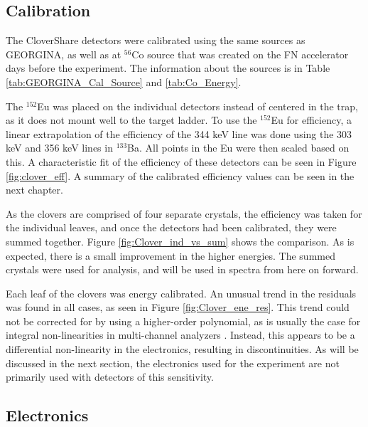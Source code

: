 \subsection{Calibration}

The CloverShare detectors were calibrated using the same sources as GEORGINA, as well as at $^{56}$Co source that was created on the FN accelerator days before the experiment. The information about the sources is in Table \ref{tab:GEORGINA_Cal_Source} and \ref{tab:Co_Energy}. 



The $^{152}$Eu was placed on the individual detectors instead of centered in the trap, as it does not mount well to the target ladder. To use the $^{152}$Eu for efficiency, a linear extrapolation of the efficiency of the 344 keV line was done using the 303 keV and 356 keV lines in $^{133}$Ba. All points in the Eu were then scaled based on this. A characteristic fit of the efficiency of these detectors can be seen in Figure \ref{fig:clover_eff}. A summary of the calibrated efficiency values can be seen in the next chapter.



As the clovers are comprised of four separate crystals, the efficiency was taken for the individual leaves, and once the detectors had been calibrated, they were summed together. Figure \ref{fig:Clover_ind_vs_sum} shows the comparison. As is expected, there is a small improvement in the higher energies. The summed crystals were used for analysis, and will be used in spectra from here on forward.



Each leaf of the clovers was energy calibrated. An unusual trend in the residuals was found in all cases, as seen in Figure \ref{fig:Clover_ene_res}. This trend could not be corrected for by using a higher-order polynomial, as is usually the case for integral non-linearities in multi-channel analyzers \citep{knoll00:rad_det_meas}. Instead, this appears to be a differential non-linearity in the electronics, resulting in discontinuities. As will be discussed in the next section, the electronics used for the experiment are not primarily used with detectors of this sensitivity.



\subsection{Electronics}

